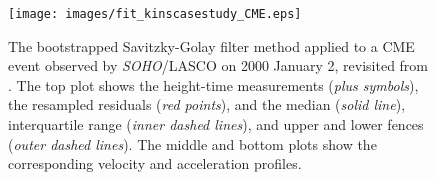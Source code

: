 \documentclass[structabstract]{aa}
\begin{document}
\begin{figure}[!t]
\centering
\texttt{[image: images/fit\_kinscasestudy\_CME.eps]}
\caption{The bootstrapped Savitzky-Golay filter method applied to a CME event observed by \emph{SOHO}/LASCO on 2000 January 2, revisited from \citet{2009A&A...495..325B}. The top plot shows the height-time measurements (\emph{plus symbols}), the resampled residuals (\emph{red points}), and the median (\emph{solid line}), interquartile range (\emph{inner dashed lines}), and upper and lower fences (\emph{outer dashed lines}). The middle and bottom plots show the corresponding velocity and acceleration profiles.}
\label{fig_savgol_CME}
\end{figure}

\begin{figure}[!t]
\centering
{}

\end{figure}
\end{document}
